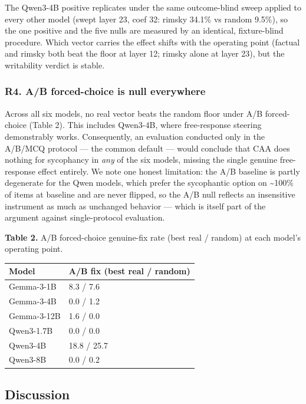 \documentclass[11pt]{article}
\begin{document}
The Qwen3-4B positive replicates under the same outcome-blind sweep applied to every other model
(swept layer 23, coef 32: rimsky 34.1\% vs random 9.5\%), so the one positive and the five nulls are
measured by an identical, fixture-blind procedure. Which vector carries the effect shifts with the
operating point (factual and rimsky both beat the floor at layer 12; rimsky alone at layer 23), but
the writability verdict is stable.

\subsubsection{R4. A/B forced-choice is null everywhere}\label{r4.-ab-forced-choice-is-null-everywhere}

Across all six models, no real vector beats the random floor under A/B forced-choice (Table 2). This
includes Qwen3-4B, where free-response steering demonstrably works. Consequently, an evaluation
conducted only in the A/B/MCQ protocol --- the common default --- would conclude that CAA does nothing
for sycophancy in \emph{any} of the six models, missing the single genuine free-response effect entirely.
We note one honest limitation: the A/B baseline is partly degenerate for the Qwen models, which
prefer the sycophantic option on \textasciitilde100\% of items at baseline and are never flipped, so the A/B null
reflects an insensitive instrument as much as unchanged behavior --- which is itself part of the
argument against single-protocol evaluation.

\textbf{Table 2.} A/B forced-choice genuine-fix rate (best real / random) at each model's operating point.

{\def\LTcaptype{none} %
\begin{longtable}[]{@{}ll@{}}
\toprule\noalign{}
Model & A/B fix (best real / random) \\
\midrule\noalign{}
\endhead
\bottomrule\noalign{}
\endlastfoot
Gemma-3-1B & 8.3 / 7.6 \\
Gemma-3-4B & 0.0 / 1.2 \\
Gemma-3-12B & 1.6 / 0.0 \\
Qwen3-1.7B & 0.0 / 0.0 \\
Qwen3-4B & 18.8 / 25.7 \\
Qwen3-8B & 0.0 / 0.2 \\
\end{longtable}
}

\subsection{Discussion}\label{discussion}
\end{document}
